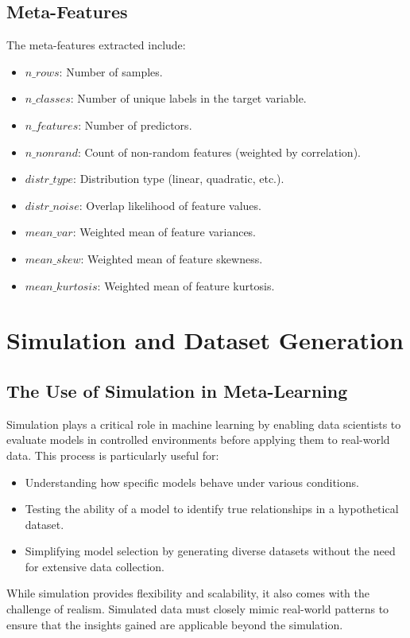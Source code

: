 \documentclass[a4paper,11pt]{article}
\begin{document}
\subsection{Meta-Features}
The meta-features extracted include:
\begin{itemize}
    \item \(n\_rows\): Number of samples.
    \item \(n\_classes\): Number of unique labels in the target variable.
    \item \(n\_features\): Number of predictors.
    \item \(n\_nonrand\): Count of non-random features (weighted by correlation).
    \item \(distr\_type\): Distribution type (linear, quadratic, etc.).
    \item \(distr\_noise\): Overlap likelihood of feature values.
    \item \(mean\_var\): Weighted mean of feature variances.
    \item \(mean\_skew\): Weighted mean of feature skewness.
    \item \(mean\_kurtosis\): Weighted mean of feature kurtosis.
\end{itemize}

\section{Simulation and Dataset Generation}
\subsection{The Use of Simulation in Meta-Learning}
Simulation plays a critical role in machine learning by enabling data scientists to evaluate models in controlled environments before applying them to real-world data. This process is particularly useful for:
\begin{itemize}
    \item Understanding how specific models behave under various conditions.
    \item Testing the ability of a model to identify true relationships in a hypothetical dataset.
    \item Simplifying model selection by generating diverse datasets without the need for extensive data collection.
\end{itemize}

While simulation provides flexibility and scalability, it also comes with the challenge of realism. Simulated data must closely mimic real-world patterns to ensure that the insights gained are applicable beyond the simulation.
\end{document}
